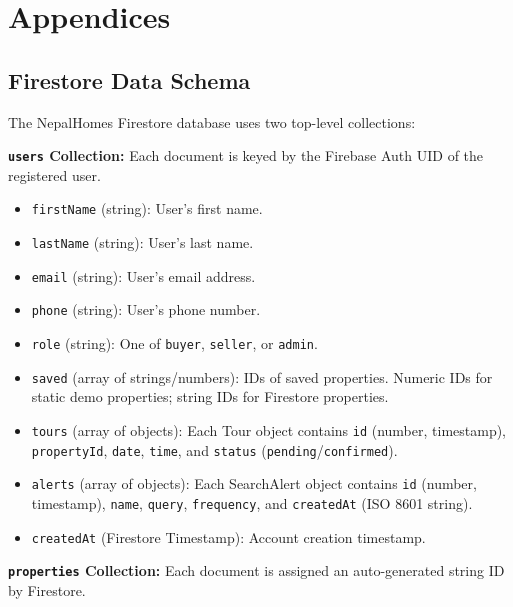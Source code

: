\documentclass[12pt,a4paper]{report}
\begin{document}
\clearpage

\appendix
\chapter{Appendices}

\section{Firestore Data Schema}

The NepalHomes Firestore database uses two top-level collections:

\noindent\textbf{\texttt{users} Collection:}
Each document is keyed by the Firebase Auth UID of the registered user.

\begin{itemize}[leftmargin=2.5em]
  \item \texttt{firstName} (string): User's first name.
  \item \texttt{lastName} (string): User's last name.
  \item \texttt{email} (string): User's email address.
  \item \texttt{phone} (string): User's phone number.
  \item \texttt{role} (string): One of \texttt{buyer}, \texttt{seller}, or
    \texttt{admin}.
  \item \texttt{saved} (array of strings/numbers): IDs of saved properties.
    Numeric IDs for static demo properties; string IDs for Firestore properties.
  \item \texttt{tours} (array of objects): Each Tour object contains
    \texttt{id} (number, timestamp), \texttt{propertyId}, \texttt{date},
    \texttt{time}, and \texttt{status} (\texttt{pending}/\texttt{confirmed}).
  \item \texttt{alerts} (array of objects): Each SearchAlert object contains
    \texttt{id} (number, timestamp), \texttt{name}, \texttt{query},
    \texttt{frequency}, and \texttt{createdAt} (ISO 8601 string).
  \item \texttt{createdAt} (Firestore Timestamp): Account creation timestamp.
\end{itemize}

\noindent\textbf{\texttt{properties} Collection:}
Each document is assigned an auto-generated string ID by Firestore.
\end{document}

